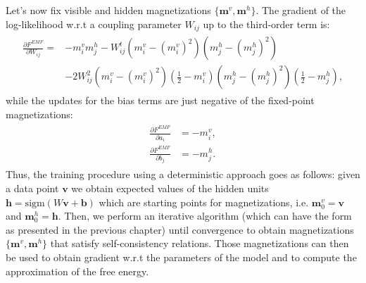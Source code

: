\documentclass[../report/report.tex]{subfiles}
\begin{document}
Let's now fix visible and hidden magnetizations $\{ \mathbf{m}^v, \mathbf{m}^h \}$. The gradient of the log-likelihood w.r.t a coupling parameter $W_{ij}$ up to the third-order term is:
\begin{align*}
\begin{split}
\frac{\partial F^{EMF}}{\partial W_{ij}} = & -m_i^v m_j^h - W_{ij}^t(m_i^v - (m_i^v)^2)(m_j^h - (m_j^h)^2) \\
 & - 2W_{ij}^2 (m_i^v - (m_i^v)^2)(\frac{1}{2} - m_i^v)(m_j^h - (m_j^h)^2)(\frac{1}{2} - m_j^h),
\end{split}
\end{align*}
while the updates for the bias terms are just negative of the fixed-point magnetizations:
\begin{align}
\begin{split}\frac{\partial F^{EMF}}{\partial a_i} &= -m_i^v, \\
\frac{\partial F^{EMF}}{\partial b_j} & = -m_j^h.
\end{split}
\end{align}
Thus, the training procedure using a deterministic approach goes as follows: given a data point $\mathbf{v}$ we obtain expected values of the hidden units $\mathbf{h} = \text{sigm} ( W\mathbf{v} + \mathbf{b})$ which are starting points for magnetizations, i.e. $\mathbf{m}^v_0 = \mathbf{v}$ and $\mathbf{m}^{h}_0 = \mathbf{h}$. Then, we perform an iterative algorithm (which can have the form as presented in the previous chapter) until convergence to obtain magnetizations $\{ \mathbf{m}^v,\mathbf{m}^h\}$ that satisfy self-consistency relations. Those magnetizations can then be used to obtain gradient w.r.t the parameters of the model and to compute the approximation of the free energy.
 
\end{document}
